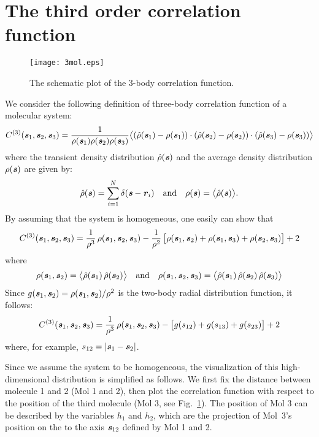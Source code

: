 \documentclass[aip,jcp,a4paper,reprint,onecolumn]{revtex4-1}
\newcommand{\vect}[1]{\textbf{\textit{#1}}}
\newcommand{\corr}{C^{(3)}}
\begin{document}
\section{The third order correlation function}
\label{app:3}
\begin{figure}
  \centering
  \texttt{[image: 3mol.eps]}
  \caption{The schematic plot of the 3-body correlation function.}\label{fig:tmp3}
\end{figure}
We consider the following definition of three-body correlation function of a molecular system:
\begin{align}
  \corr (\vect s_1, \vect s_2, \vect s_3)
  =
  \frac1{\rho(\vect s_1)\rho(\vect s_2)\rho(\vect s_3)}
  \big\langle
  (\hat\rho(\vect s_1) - \rho(\vect s_1))\cdot
  (\hat\rho(\vect s_2) - \rho(\vect s_2))\cdot
  (\hat\rho(\vect s_3) - \rho(\vect s_3))
  \big\rangle
\end{align}
where the transient density distribution $\hat\rho(\vect s)$ and the
average density distribution $\rho(\vect s)$ are given
by:
\begin{align}
  \hat\rho(\vect s) = \sum_{i=1}^N\delta(\vect s - \vect r_i)
  \quad\textrm{and}\quad
  \rho(\vect s) = \big\langle \hat\rho(\vect s)\big\rangle.
\end{align}
By assuming that the system is homogeneous, one easily can show that
\begin{align}
  \corr (\vect s_1, \vect s_2, \vect s_3)
  =
  \frac1{\rho^3}\,\rho(\vect s_1, \vect s_2, \vect s_3) -
  \frac1{\rho^2}\,\big[
  \rho(\vect s_1, \vect s_2) +
  \rho(\vect s_1, \vect s_3) +
  \rho(\vect s_2, \vect s_3)
  \big] + 2
\end{align}
where
\begin{align}
  \rho(\vect s_1, \vect s_2)
  =
  \big\langle
  \hat\rho(\vect s_1)\,  \hat\rho(\vect s_2)
  \big\rangle
  \quad\textrm{and}\quad
  \rho(\vect s_1, \vect s_2, \vect s_3)
  =
  \big\langle
  \hat\rho(\vect s_1)\,  \hat\rho(\vect s_2)\, \hat\rho(\vect s_3)
  \big\rangle  
\end{align}
Since $g (\vect s_1, \vect s_2) = \rho(\vect s_1, \vect s_2)/\rho^2$
is the two-body radial distribution function, it follows:
\begin{align}
  \corr (\vect s_1, \vect s_2, \vect s_3)
  =
  \frac1{\rho^3}\,\rho(\vect s_1, \vect s_2, \vect s_3) -
  \big[
  g(s_{12}) +
  g(s_{13}) +
  g(s_{23})
  \big] + 2
\end{align}
where, for example, $s_{12} = \vert \vect s_1 -\vect s_2\vert$.

Since we assume the system to be homogeneous, the visualization of this high-dimensional
distribution is simplified as follows. We first fix the distance between molecule 1 and 2 (Mol 1 and 2), then plot the correlation function with
respect to the position of the third molecule (Mol 3, see
Fig.~\ref{fig:tmp3}).  The position of Mol 3 can be described by
the variables $h_1$ and $h_2$, which are
the projection of Mol~3's position on the to the
axis $\vect s_{12}$ defined by Mol 1 and 2.
\end{document}
